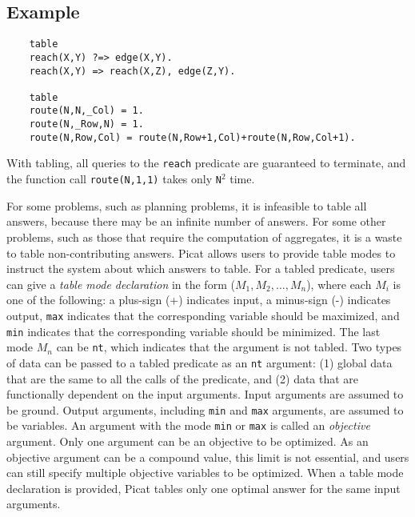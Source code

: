\subsection*{Example}
\begin{verbatim}
    table
    reach(X,Y) ?=> edge(X,Y).
    reach(X,Y) => reach(X,Z), edge(Z,Y).

    table
    route(N,N,_Col) = 1.
    route(N,_Row,N) = 1.
    route(N,Row,Col) = route(N,Row+1,Col)+route(N,Row,Col+1).
\end{verbatim}
With tabling, all queries to the \texttt{reach} predicate are guaranteed to terminate, and the function call \texttt{route(N,1,1)} takes only \texttt{N}$^2$ time.

For some problems, such as planning problems, it is infeasible to table all answers, because there may be an infinite number of answers. For some other problems, such as those that require the computation of aggregates, it is a waste to table non-contributing answers. Picat allows users to provide table modes to instruct the system about which answers to table. For a tabled predicate, users can give a \emph{table mode declaration} in the form ($M_{1},M_{2},\ldots,M_{n}$), where each $M_{i}$ is one of the following: a plus-sign (+) indicates input, a minus-sign (-) indicates output, \texttt{max} indicates that the corresponding variable should be maximized, and \texttt{min} indicates that the corresponding variable should be minimized. The last mode $M_{n}$ can be \texttt{nt}, which indicates that the argument is not tabled. Two types of data can be passed to a tabled predicate as an \texttt{nt} argument: (1) global data that are the same to all the calls of the predicate, and (2) data that are functionally dependent on the input arguments. Input arguments are assumed to be ground.  Output arguments, including \texttt{min} and \texttt{max} arguments, are assumed to be variables. An argument with the mode \texttt{min} or \texttt{max} is called an \emph{objective} argument. Only one argument can be an objective to be optimized. As an objective argument can be a compound value, this limit is not essential, and users can still specify multiple objective variables to be optimized. When a table mode declaration is provided, Picat tables only one optimal answer for the same input arguments.


